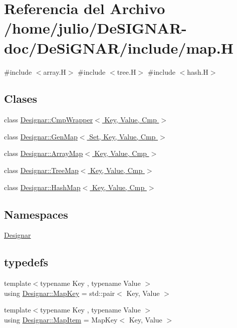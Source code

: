 \hypertarget{map_8_h}{}\section{Referencia del Archivo /home/julio/\+De\+S\+I\+G\+N\+A\+R-\/doc/\+De\+Si\+G\+N\+A\+R/include/map.H}
\label{map_8_h}
{\ttfamily \#include $<$array.\+H$>$}\newline
{\ttfamily \#include $<$tree.\+H$>$}\newline
{\ttfamily \#include $<$hash.\+H$>$}\newline
\subsection*{Clases}
\begin{DoxyCompactItemize}
\item 
class \hyperlink{class_designar_1_1_cmp_wrapper}{Designar\+::\+Cmp\+Wrapper$<$ Key, Value, Cmp $>$}
\item 
class \hyperlink{class_designar_1_1_gen_map}{Designar\+::\+Gen\+Map$<$ Set, Key, Value, Cmp $>$}
\item 
class \hyperlink{class_designar_1_1_array_map}{Designar\+::\+Array\+Map$<$ Key, Value, Cmp $>$}
\item 
class \hyperlink{class_designar_1_1_tree_map}{Designar\+::\+Tree\+Map$<$ Key, Value, Cmp $>$}
\item 
class \hyperlink{class_designar_1_1_hash_map}{Designar\+::\+Hash\+Map$<$ Key, Value, Cmp $>$}
\end{DoxyCompactItemize}
\subsection*{Namespaces}
\begin{DoxyCompactItemize}
\item 
 \hyperlink{namespace_designar}{Designar}
\end{DoxyCompactItemize}
\subsection*{typedefs}
\begin{DoxyCompactItemize}
\item 
{\footnotesize template$<$typename Key , typename Value $>$ }\\using \hyperlink{namespace_designar_a7394b1b25278abf7211e77b91eb5204f}{Designar\+::\+Map\+Key} = std\+::pair$<$ Key, Value $>$
\item 
{\footnotesize template$<$typename Key , typename Value $>$ }\\using \hyperlink{namespace_designar_abc6ea5602461a15100a645d1f0e5cbcb}{Designar\+::\+Map\+Item} = Map\+Key$<$ Key, Value $>$
\end{DoxyCompactItemize}
